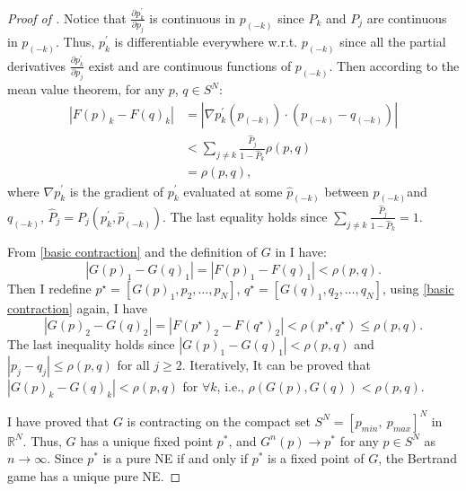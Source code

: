 \begin{proof}[Proof of ]
    Notice that $\frac{\partial p^{\prime}_k}{\partial p_j}$ is continuous
    in $p_{(-k)}$ since $P_k$ and $P_j$ are continuous in $p_{(-k)}$.
    Thus, $p^{\prime}_{k}$ is differentiable everywhere w.r.t. $p_{(-k)}$ since all
    the partial derivatives $\frac{\partial p^{\prime}_k}{\partial p_j}$
    exist and are continuous functions of $p_{(-k)}$.
    Then according to the mean value theorem, for any $p$, $q \in S^{N}$:
    \begin{equation}
        \label{basic contraction}
        \begin{aligned}
            |F(p)_k - F(q)_k| & = |\nabla p^{\prime}_k(\hat{p}_{(-k)}) \cdot (p_{(-k)} - q_{(-k)})| \\
                              & < \sum_{j \neq k} \frac{\hat{P}_j}{1 - \hat{P}_k} \rho(p, q)        \\
                              & = \rho(p, q),
        \end{aligned}
    \end{equation}
    where $\nabla p^{\prime}_k$ is the gradient of $p^{\prime}_k$
    evaluated at some $\hat{p}_{(-k)}$ between $p_{(-k)}$and $q_{(-k)}$,
    $\hat{P}_j = P_j(p^{\prime}_{k}, \hat{p}_{(-k)})$.
    The last equality holds since $\sum_{j \neq k} \frac{\hat{P}_j}{1 - \hat{P}_k} = 1$.

    From \eqref{basic contraction} and the definition of $G$ in  I have:
    \[
        |G(p)_1 - G(q)_1| = |F(p)_1 - F(q)_1| < \rho(p, q).
    \]
    Then I redefine $p^{\star} = [G(p)_1, p_2, \dots, p_N]$,
    $q^{\star} = [G(q)_1, q_2, \dots, q_N]$,
    using \eqref{basic contraction}
    again, I have
    \[
        |G(p)_2 - G(q)_2| = |F(p^{\star})_2 - F(q^{\star})_2|
        < \rho(p^{\star}, q^{\star}) \leq \rho(p, q).
    \]
    The last inequality holds since $|G(p)_1 - G(q)_1| < \rho(p, q)$
    and $|p_j - q_j| \leq \rho(p, q)$ for all $j \geq 2$.
    Iteratively, It can be proved that $|G(p)_k - G(q)_k| < \rho(p, q)$ for $\forall k$, i.e.,
    $\rho(G(p), G(q)) < \rho(p, q)$.

    I have proved that $G$ is contracting on the compact set $S^N = [p_{min}, ~p_{max}]^N$
    in $\mathbb{R}^N$.
    Thus, $G$ has a unique fixed point $p^{*}$,
    and $G^{n}(p) \rightarrow p^{*}$ for any $p \in S^{N}$ as $n \rightarrow \infty$.
    Since $p^{*}$ is a pure NE if and only if $p^{*}$ is a fixed point of $G$,
    the Bertrand game has a unique pure NE.
\end{proof}

